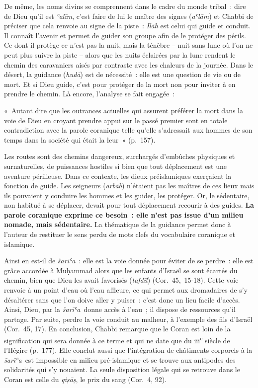De même, les noms divins se comprennent dans le cadre du monde tribal~:
dire de Dieu qu'il est \emph{ʿalīm}, c'est faire de lui le maître des
signes (\emph{aʿlām}) et Chabbi de préciser que cela renvoie au signe de
la piste~: \emph{Ilāh} est celui qui guide et conduit. Il connaît
l'avenir et permet de guider son groupe afin de le protéger des périls.
Ce dont il protège ce n'est pas la nuit, mais la ténèbre -- nuit sans
lune où l'on ne peut plus suivre la piste -- alors que les nuits
éclairées par la lune rendent le chemin des caravaniers aisés par
contraste avec les chaleurs de la journée. Dans le désert, la guidance
(\emph{hudā}) est de nécessité~: elle est une question de vie ou de
mort. Et si Dieu guide, c'est pour protéger de la mort non pour inviter
à en prendre le chemin. Là encore, l'analyse se fait engagée~:

«~Autant dire que les outrances actuelles qui assurent préférer la mort
dans la voie de Dieu en croyant prendre appui sur le passé premier sont
en totale contradiction avec la parole coranique telle qu'elle
s'adressait aux hommes de son temps dans la société qui était la leur~»
(p.~157).

Les routes sont des chemins dangereux, surchargés d'embûches physiques
et surnaturelles, de puissances hostiles si bien que tout déplacement
est une aventure périlleuse. Dans ce contexte, les dieux préislamiques
exerçaient la fonction de guide. Les seigneurs (\emph{arbāb}) n'étaient
pas les maîtres de ces lieux mais ils pouvaient y conduire les hommes et
les guider, les protéger. Or, le sédentaire, non habitué à se déplacer,
devait pour tout déplacement recourir à des guides. \textbf{La parole
coranique exprime ce besoin~: elle n'est pas issue d'un milieu nomade,
mais sédentaire.} La thématique de la guidance permet donc à l'auteur de
restituer le sens perdu de mots clefs du vocabulaire coranique et
islamique.


Ainsi en est-il de \emph{šarīʿa}~: elle est la voie donnée pour éviter
de se perdre~: elle est grâce accordée à Muḥammad alors que les enfants
d'Israël se sont écartés du chemin, bien que Dieu les avait favorisés
(\emph{tafdīl}) (Cor.~45,~15-18). Cette voie renvoie à un point d'eau où
l'eau affleure, ce qui permet aux dromadaires de s'y désaltérer sans que
l'on doive aller y puiser~: c'est donc un lieu facile d'accès. Ainsi,
Dieu, par la \emph{šarīʿa}~donne accès à l'eau~; il dispose de
ressources qu'il partage. Par suite, perdre la voie conduit au malheur,
à l'exemple des fils d'Israël (Cor.~45, 17). En conclusion, Chabbi
remarque que le Coran est loin de la signification qui sera donnée à ce
terme et qui ne date que du iii\textsuperscript{e} siècle de l'Hégire
(p.~177). Elle conclut aussi que l'intégration de châtiments corporels à
la \emph{šarīʿa}~est impossible en milieu pré-islamique et se trouve aux
antipodes des solidarités qui s'y nouaient. La seule disposition légale
qui se retrouve dans le Coran est celle du \emph{qiṣāṣ}, le prix du sang
(Cor.~4, 92).

